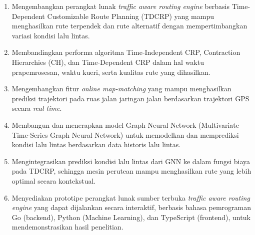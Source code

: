 \begin{enumerate}
    \item Mengembangkan  perangkat lunak \textit{traffic aware routing engine} berbasis Time-Dependent Customizable Route Planning (TDCRP) yang mampu menghasilkan rute terpendek dan rute alternatif dengan mempertimbangkan variasi kondisi lalu lintas.
    \item Membandingkan performa algoritma Time-Independent CRP, Contraction Hierarchies (CH), dan Time-Dependent CRP dalam hal waktu prapemrosesan, waktu kueri, serta kualitas rute yang dihasilkan.
    \item Mengembangkan fitur \textit{online map-matching} yang mampu menghasilkan      prediksi trajektori pada ruas jalan jaringan jalan berdasarkan trajektori GPS secara \textit{real time}.
    \item  Membangun dan menerapkan model Graph Neural Network (Multivariate Time-Series Graph Neural Network) untuk memodelkan dan memprediksi kondisi lalu lintas berdasarkan data historis lalu lintas.
    \item Mengintegrasikan prediksi kondisi lalu lintas dari GNN ke dalam fungsi biaya pada TDCRP, sehingga mesin perutean mampu menghasilkan rute yang lebih optimal secara kontekstual.  
    
    \item Menyediakan prototipe perangkat lunak sumber terbuka \textit{traffic aware routing engine} yang dapat dijalankan secara interaktif, berbasis bahasa pemrograman Go (backend), Python (Machine Learning), dan TypeScript (frontend), untuk mendemonstrasikan hasil penelitian.
\end{enumerate}